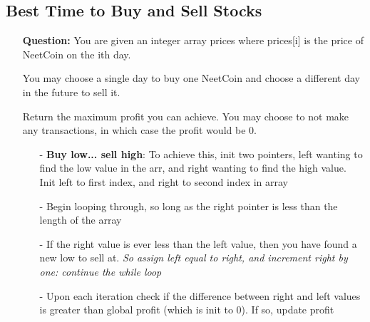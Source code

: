 \documentclass[12pt]{article}
\begin{document}
\subsection{Best Time to Buy and Sell Stocks}
\begin{enumerate}
  \item[] \textbf{Question:} You are given an integer array prices where prices[i] is the price of NeetCoin on the ith day.

You may choose a single day to buy one NeetCoin and choose a different day in the future to sell it.

Return the maximum profit you can achieve. You may choose to not make any transactions, in which case the profit would be 0.
    \begin{enumerate}
      \item[-] \textbf{Buy low... sell high}: To achieve this, init two pointers, left wanting to find the low value in the arr, and right wanting to find the high value. Init left to first index, and right to second index in array
      \item[-] Begin looping through, so long as the right pointer is less than the length of the array
      \item[-] If the right value is ever less than the left value, then you have found a new low to sell at. \textit{So assign left equal to right, and increment right by one: continue the while loop}
      \item[-] Upon each iteration check if the difference between right and left values is greater than global profit (which is init to 0). If so, update profit 
    \end{enumerate}
\end{enumerate}
\end{document}
